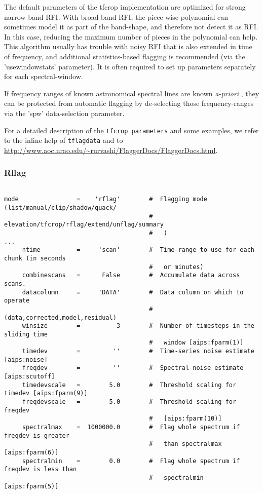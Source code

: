 The default parameters of the tfcrop implementation are optimized for
strong narrow-band RFI. With broad-band RFI, the piece-wise polynomial
can sometimes model it as part of the band-shape, and therefore not
detect it as RFI. In this case, reducing the maximum number of pieces
in the polynomial can help. This algorithm usually has trouble with
noisy RFI that is also extended in time of frequency, and additional
statistics-based flagging is recommended (via the 'usewindowstats'
parameter). It is often required to set up parameters separately for
each spectral-window.

If frequency ranges of known astronomical spectral lines are known {\it 
a-priori} , they can be protected from automatic flagging by
de-selecting those frequency-ranges via the 'spw' data-selection
parameter.


For a detailed description of the {\tt tfcrop parameters} and some
examples, we refer to the inline help of {\tt tflagdata} and to
\url{http://www.aoc.nrao.edu/\~rurvashi/FlaggerDocs/FlaggerDocs.html}.

\subsubsection{Rflag}
\label{section:edit.tflagdata.mode.rflag}

\small
\begin{verbatim}

mode                =    'rflag'        #  Flagging mode (list/manual/clip/shadow/quack/
                                        #   elevation/tfcrop/rflag/extend/unflag/summary
                                        #   )
...
     ntime          =     'scan'        #  Time-range to use for each chunk (in seconds
                                        #   or minutes)
     combinescans   =      False        #  Accumulate data across scans.
     datacolumn     =     'DATA'        #  Data column on which to operate
                                        #   (data,corrected,model,residual)
     winsize        =          3        #  Number of timesteps in the sliding time
                                        #   window [aips:fparm(1)]
     timedev        =         ''        #  Time-series noise estimate [aips:noise]
     freqdev        =         ''        #  Spectral noise estimate [aips:scutoff]
     timedevscale   =        5.0        #  Threshold scaling for timedev [aips:fparm(9)]
     freqdevscale   =        5.0        #  Threshold scaling for freqdev
                                        #   [aips:fparm(10)]
     spectralmax    =  1000000.0        #  Flag whole spectrum if freqdev is greater
                                        #   than spectralmax [aips:fparm(6)]
     spectralmin    =        0.0        #  Flag whole spectrum if freqdev is less than
                                        #   spectralmin [aips:fparm(5)]
                                       
\end{verbatim}
\normalsize

